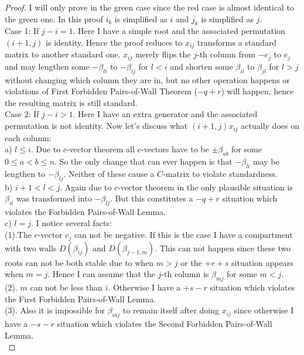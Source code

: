 \begin{proof}
\indent I will only prove in the green case since the red case is almost identical to the green one. In this proof $i_k$ is simplified as $i$ and $j_k$ is simplified as $j$.\\
\indent Case 1: If $j - i  = 1$. Here I have a simple root and the associated permutation $(i+1,j)$ is identity. Hence the proof reduces to $x_{ij}$ transforms a standard matrix to another standard one. $x_{ij}$ merely flips the $j$-th column from $-e_j$ to $e_j$ and may lengthen some $-\beta_{li}$ to $-\beta_{lj}$ for $l<i$ and shorten some $\beta_{il}$ to $\beta_{jl}$ for $l>j$ without changing which column they are in, but no other operation happens or violations of First Forbidden Pairs-of-Wall Theorem ($-q+r$) will happen, hence the resulting matrix is still standard.\\
\indent Case 2: If $j - i > 1$. Here I have an extra generator and the associated permutation is not identity. Now let's discuss what $(i+1,j) x_{ij}$ actually does on each column:\\
\indent a) $l\leq i$. Due to $c$-vector theorem \cite{IOTW3} all c-vectors have to be $\pm\beta_{ab}$ for some $0\leq a<b\leq n$. So the only change that can ever happen is that $-\beta_{li}$ may be lengthen to $-\beta_{lj}$. Neither of these cause a $C$-matrix to violate standardness.\\
\indent b) $i + 1 < l < j$. Again due to $c$-vector theorem in \cite{IOTW3} the only plausible situation is $\beta_{il}$ was transformed into $-\beta_{lj}$. But this constitutes a $-q+r$ situation which violates the Forbidden Pairs-of-Wall Lemma.\\
\indent c) $l = j$. I notice several facts:\\
\indent (1).The $c$-vector $c_j$ can not be negative. If this is the case I have a compartment with two walls $D(\beta_{ij})$ and $D(\beta_{j-1,m})$. This can not happen since these two roots can not be both stable due to \cite{ST12} when $m>j$ or the $+r+s$ situation appears when $m=j$. Hence I can assume that the $j$-th column is $\beta_{mj}$ for some $m<j$.\\
\indent (2). $m$ can not be less than $i$. Otherwise I have a $+s-r$ situation which violates the First Forbidden Pairs-of-Wall Lemma.\\
\indent (3). Also it is impossible for $\beta_{mj}$ to remain itself after doing $x_{ij}$ since otherwise I have a $-s-r$ situation which violates the Second Forbidden Pairs-of-Wall Lemma.\\

\end{proof}

